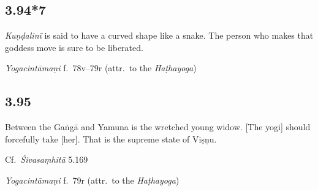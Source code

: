 \begin{ekdosis}
\subsection*{3.94*7}
\begin{translation}[hp03_094_7]
\emph{Kuṇḍalinī} is said to have a curved shape like a snake. The person who makes that goddess move is sure to be liberated.
\end{translation}


\begin{testimonia}[hp03_094_7]
\emph{Yogacintāmaṇi} f.~78v–79r (attr.~to the \emph{Haṭhayoga})
\begin{versinnote}
\end{versinnote}
\end{testimonia}



\subsection*{3.95}
\begin{translation}[hp03_095]
Between the Gaṅgā and Yamuna is the wretched young widow. [The yogi] should forcefully take [her]. That is the supreme state of Viṣṇu.
\end{translation}

\begin{sources}[hp03_095]
Cf.~\emph{Śivasaṃhitā} 5.169
\begin{versinnote}
\end{versinnote}
\end{sources}

\begin{testimonia}[hp03_095]
\emph{Yogacintāmaṇi} f.~79r (attr.~to the \emph{Haṭhayoga})
\begin{versinnote}
\end{versinnote}


\end{testimonia}
\end{ekdosis}
